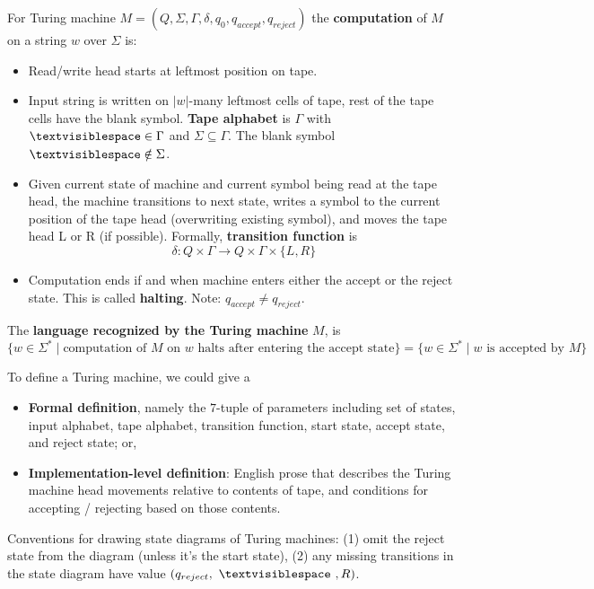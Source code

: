 \documentclass[12pt, oneside]{article}
\begin{document}
For Turing machine $M= (Q, \Sigma, \Gamma, \delta, q_0, q_{accept}, q_{reject})$ 
the {\bf computation} of $M$ on a string $w$ over $\Sigma$  is:

\vspace{-20pt}

\begin{itemize}
\setlength{\itemsep}{0pt}
\item Read/write head starts at leftmost position on tape. 
\item Input string is written on $|w|$-many leftmost cells of tape, 
rest of  the tape cells have  the blank symbol. {\bf Tape alphabet} 
is $\Gamma$ with $\textvisiblespace\in \Gamma$ and $\Sigma \subseteq \Gamma$.
The blank symbol $\textvisiblespace \notin \Sigma$.
\item Given current state of machine and current symbol being read at the tape head, 
the machine transitions to next state, writes a symbol to the current position  of the 
tape  head (overwriting existing symbol), and moves the tape head L or R (if possible). 
Formally, {\bf transition function}  is 
\[
  \delta: Q\times \Gamma \to Q \times \Gamma \times \{L, R\}
\]
\item Computation ends if and when machine enters either the accept or the reject state.
This is called {\bf halting}.
Note: $q_{accept} \neq q_{reject}$.
\end{itemize}

The {\bf language recognized by the  Turing machine} $M$,  is  
\[
  \{ w \in \Sigma^* \mid \textrm{computation of $M$ on $w$ halts after entering the accept state}\} = \{ w \in \Sigma^* \mid w \textrm{ is accepted by } M\}
\]
  
To define a Turing machine, we could give a 
\begin{itemize}
\item {\bf Formal definition}, namely the $7$-tuple of parameters including set of states, 
input alphabet, tape alphabet, transition function, start state, accept state, and reject state; or,
\item {\bf Implementation-level definition}: English prose that describes the Turing machine head 
movements relative to contents of tape, and conditions for accepting / rejecting based on those contents.
\end{itemize}

Conventions for drawing state diagrams of Turing machines: (1) omit the reject state from the diagram (unless 
it's the  start state), (2) any missing transitions in the state diagram have value $(q_{reject}, ~\textvisiblespace~ , R)$.
\end{document}

